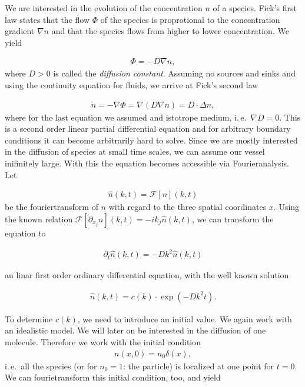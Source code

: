 We are interested in the evolution of the concentration $n$ of a
species. Fick's first law states that the flow $\Phi$ of the species
is proprotional to the concentration gradient $\nabla n$ and that the
species flows from higher to lower concentration. We yield

\begin{align*}
  \Phi = - D \nabla n,
\end{align*}
where $D > 0$ is called the \emph{diffusion constant}. Assuming no
sources and sinks and using the continuity equation for fluids, we
arrive at Fick's second law

\begin{align*}
  \dot n = - \nabla \Phi = \nabla (D \nabla n) = D \cdot \Delta n,
\end{align*}
where for the last equation we assumed and istotrope medium, i.\,e.\
$\nabla D = 0$. This is a second order linear partial differential
equation and for arbitrary boundary conditions it can become
arbitrarily hard to solve. Since we are mostly interested in the
diffusion of species at small time scales, we can assume our vessel
inifinitely large. With this the equation becomes accessible via
Fourieranalysis. Let

\begin{align*}
  \hat n(k,t) = \mathcal{F}[n](k,t)
\end{align*}
be the fouriertransform of $n$ with regard to the three spatial
coordinates $x$. Using the known relation $\mathcal{F}[\partial_{x_j}
n](k,t) = -ik_j \hat n(k,t)$, we can transform the equation to

\begin{align*}
  \partial_t \hat n(k,t) =  - Dk^2 \hat n(k,t)
\end{align*}

an linar first order ordinary differential equation, with the well
known solution

\begin{align}
  \hat n(k,t) = c(k) \cdot \exp(-Dk^2 t). \label{eq:sol-ft}
\end{align}

To determine $c(k)$, we need to introduce an initial value. We again
work with an idealistic model. We will later on be interested in the
diffusion of one molecule. Therefore we work with the initial
condition
\begin{align*}
  n(x,0) = n_0 \delta(x),
\end{align*}
i.\,e.\ all the species (or for $n_0 = 1$: the particle) is localized
at one point for $t = 0$. We can fourietransform this initial
condition, too, and yield

